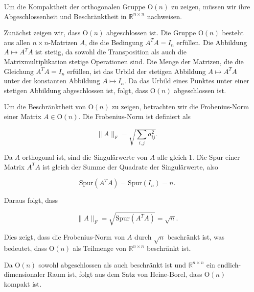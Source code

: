 Um die Kompaktheit der orthogonalen Gruppe $\mathrm{O}(n)$ zu zeigen, müssen wir ihre Abgeschlossenheit und Beschränktheit in $\mathbb{R}^{n \times n}$ nachweisen. 

Zunächst zeigen wir, dass $\mathrm{O}(n)$ abgeschlossen ist. Die Gruppe $\mathrm{O}(n)$ besteht aus allen $n \times n$-Matrizen $A$, die die Bedingung $A^T A = I_n$ erfüllen. Die Abbildung $A \mapsto A^T A$ ist stetig, da sowohl die Transposition als auch die Matrixmultiplikation stetige Operationen sind. Die Menge der Matrizen, die die Gleichung $A^T A = I_n$ erfüllen, ist das Urbild der stetigen Abbildung $A \mapsto A^T A$ unter der konstanten Abbildung $A \mapsto I_n$. Da das Urbild eines Punktes unter einer stetigen Abbildung abgeschlossen ist, folgt, dass $\mathrm{O}(n)$ abgeschlossen ist.

Um die Beschränktheit von $\mathrm{O}(n)$ zu zeigen, betrachten wir die Frobenius-Norm einer Matrix $A \in \mathrm{O}(n)$. Die Frobenius-Norm ist definiert als

\[
\|A\|_F = \sqrt{\sum_{i,j} a_{ij}^2}.
\]

Da $A$ orthogonal ist, sind die Singulärwerte von $A$ alle gleich 1. Die Spur einer Matrix $A^T A$ ist gleich der Summe der Quadrate der Singulärwerte, also

\[
\text{Spur}(A^T A) = \text{Spur}(I_n) = n.
\]

Daraus folgt, dass

\[
\|A\|_F = \sqrt{\text{Spur}(A^T A)} = \sqrt{n}.
\]

Dies zeigt, dass die Frobenius-Norm von $A$ durch $\sqrt{n}$ beschränkt ist, was bedeutet, dass $\mathrm{O}(n)$ als Teilmenge von $\mathbb{R}^{n \times n}$ beschränkt ist.

Da $\mathrm{O}(n)$ sowohl abgeschlossen als auch beschränkt ist und $\mathbb{R}^{n \times n}$ ein endlich-dimensionaler Raum ist, folgt aus dem Satz von Heine-Borel, dass $\mathrm{O}(n)$ kompakt ist.


